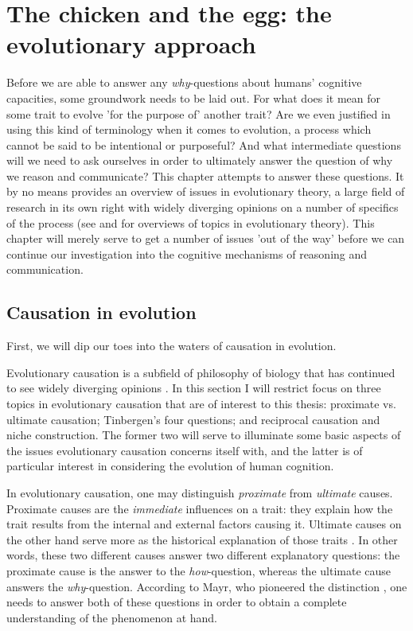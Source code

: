 \chapter{The chicken and the egg: the evolutionary approach}


Before we are able to answer any \emph{why}-questions about humans' cognitive capacities, some groundwork needs to be laid out. For what does it mean for some trait to evolve 'for the purpose of' another trait? Are we even justified in using this kind of terminology when it comes to evolution, a process which cannot be said to be intentional or purposeful? And what intermediate questions will we need to ask ourselves in order to ultimately answer the question of why we reason and communicate?
This chapter attempts to answer these questions. It by no means provides an overview of issues in evolutionary theory, a large field of research in its own right with widely diverging opinions on a number of specifics of the process (see \citet{Ariew02} and \citet{UllerLaland19} for overviews of topics in evolutionary theory).
This chapter will merely serve to get a number of issues 'out of the way' before we can continue our investigation into the cognitive mechanisms of reasoning and communication.

\section{Causation in evolution}
\label{sec:causation-evolution}

First, we will dip our toes into the waters of causation in evolution.

Evolutionary causation is a subfield of philosophy of biology that has continued to see widely diverging opinions \citep{Baedke2021, UllerLaland19}. In this section I will restrict focus on three topics in evolutionary causation that are of interest to this thesis: proximate vs. ultimate causation; Tinbergen's four questions; and reciprocal causation and niche construction.
The former two will serve to illuminate some basic aspects of the issues evolutionary causation concerns itself with, and the latter is of particular interest in considering the evolution of human cognition.

In evolutionary causation, one may distinguish \emph{proximate} from \emph{ultimate} causes.
Proximate causes are the \emph{immediate} influences on a trait: they explain how the trait results from the internal and external factors causing it.
Ultimate causes on the other hand serve more as the historical explanation of those traits \citep{Mayr61}. In other words, these two different causes answer two different explanatory questions: the proximate cause is the answer to the \emph{how}-question, whereas the ultimate cause answers the \emph{why}-question. According to Mayr, who pioneered the distinction \citep{Laland13}, one needs to answer both of these questions in order to obtain a complete understanding of the phenomenon at hand.

